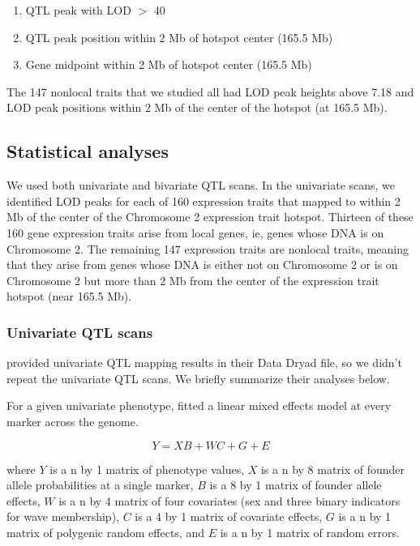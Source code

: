 \documentclass{article}
\begin{document}
\begin{enumerate}
    \item QTL peak with LOD $>$ 40
    \item QTL peak position within 2 Mb of hotspot center (165.5 Mb)
    \item Gene midpoint within 2 Mb of hotspot center (165.5 Mb)
\end{enumerate}

The 147 nonlocal traits that we studied all had LOD peak heights above 7.18 and LOD peak positions within 2 Mb of the center of the hotspot (at 165.5 Mb). 



\subsection{Statistical analyses}

We used both univariate and bivariate QTL scans. In the univariate scans, we identified LOD peaks for each of 160 expression traits that mapped to within 2 Mb of the center of the Chromosome 2 expression trait hotspot. Thirteen of these 160 gene expression traits arise from local genes, ie, genes whose DNA is on Chromosome 2. The remaining 147 expression traits are nonlocal traits, meaning that they arise from genes whose DNA is either not on Chromosome 2 or is on Chromosome 2 but more than 2 Mb from the center of the expression trait hotspot (near 165.5 Mb). 




\subsubsection{Univariate QTL scans}

\citet{keller2018genetic} provided univariate QTL mapping results in their Data Dryad file, so we didn't repeat the univariate QTL scans. We briefly summarize their analyses below.

For a given univariate phenotype, \citet{keller2018genetic} fitted a linear mixed effects model at every marker across the genome.

\begin{equation}
    Y = XB + WC + G + E
    \label{eqn:uni-lmm}
\end{equation}

where $Y$ is a n by 1 matrix of phenotype values, $X$ is a n by 8 matrix of founder allele probabilities at a single marker, $B$ is a 8 by 1 matrix of founder allele effects, $W$ is a n by 4 matrix of four covariates (sex and three binary indicators for wave membership), $C$ is a 4 by 1 matrix of covariate effects, $G$ is a n by 1 matrix of polygenic random effects, and $E$ is a n by 1 matrix of random errors.
\end{document}
